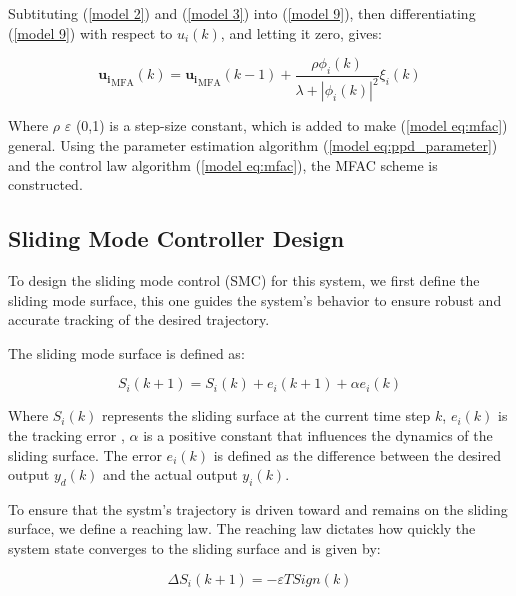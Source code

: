 \documentclass[journal,onecolumn]{IEEEtran}
\begin{document}
Subtituting (\ref{model 2}) and (\ref{model 3}) into (\ref{model 9}), then differentiating (\ref{model 9}) with respect to \(u_i(k)\), and letting it zero, gives:

\begin{equation}
    \label{model eq:mfac}
    \mathbf{u_i}_{\text{MFA}}(k) = \mathbf{u_i}_{\text{MFA}}(k - 1) + \frac{\rho \phi_i(k)}{\lambda + |\phi_i(k)|^2} \xi_i(k)
\end{equation}


Where \(\rho\) \(\varepsilon\) (0,1) is a step-size constant, which is added to make (\ref{model eq:mfac}) general. Using the parameter estimation algorithm (\ref{model eq:ppd_parameter}) and the control law algorithm (\ref{model eq:mfac}), the MFAC scheme is constructed. 


\subsection{Sliding Mode Controller Design}







To design the sliding mode control (SMC) for this system, we first define the sliding mode surface, this one guides the system's behavior to ensure robust and accurate tracking of the desired trajectory.

The sliding mode surface is defined as:

\begin{equation}
    \label{model eq:sms}
    S_i(k+1) = S_i(k)+e_i(k+1)+\alpha e_i(k) 
\end{equation}

Where \(S_i(k)\) represents the sliding surface at the current time step \(k\), \(e_i(k)\) is the tracking error , \(\alpha\) is a positive constant that influences the dynamics of the sliding surface. The error \(e_i(k)\) is defined as the difference between the desired output \(y_d(k)\) and the actual output \(y_i(k)\).

To ensure that the systm's trajectory is driven toward and remains on the sliding surface, we define a reaching law. The reaching law dictates how quickly the system state converges to the sliding surface and is given by:

\begin{equation}
    \label{model eq:reaching_law}
    \Delta S_i(k+1) = - \varepsilon T Sign(k) 
\end{equation}
\end{document}
